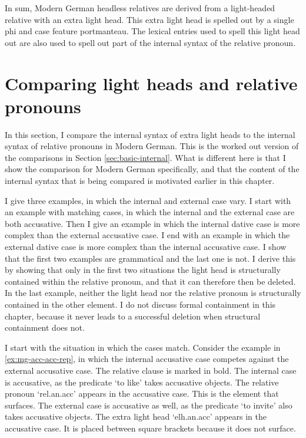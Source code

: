 In sum, Modern German headless relatives are derived from a light-headed relative with an extra light head. This extra light head is spelled out by a single phi and case feature portmanteau. The lexical entries used to spell this light head out are also used to spell out part of the internal syntax of the relative pronoun.



\section{Comparing light heads and relative pronouns}\label{sec:comparing-mg}

In this section, I compare the internal syntax of extra light heads to the internal syntax of relative pronouns in Modern German. This is the worked out version of the comparisons in Section \ref{sec:basic-internal}. What is different here is that I show the comparison for Modern German specifically, and that the content of the internal syntax that is being compared is motivated earlier in this chapter.

I give three examples, in which the internal and external case vary.
I start with an example with matching cases, in which the internal and the external case are both accusative.
Then I give an example in which the internal dative case is more complex than the external accusative case.
I end with an example in which the external dative case is more complex than the internal accusative case.
I show that the first two examples are grammatical and the last one is not. I derive this by showing that only in the first two situations the light head is structurally contained within the relative pronoun, and that it can therefore then be deleted.
In the last example, neither the light head nor the relative pronoun is structurally contained in the other element.
I do not discuss formal containment in this chapter, because it never leads to a successful deletion when structural containment does not.

I start with the situation in which the cases match.
Consider the example in \ref{ex:mg-acc-acc-rep}, in which the internal accusative case competes against the external accusative case. The relative clause is marked in bold.
The internal case is accusative, as the predicate  `to like' takes accusative objects. The relative pronoun  `\ac{rel}.\ac{an}.\ac{acc}' appears in the accusative case. This is the element that surfaces.
The external case is accusative as well, as the predicate  `to invite' also takes accusative objects. The extra light head  `\ac{elh}.\ac{an}.\ac{acc}' appears in the accusative case. It is placed between square brackets because it does not surface.

